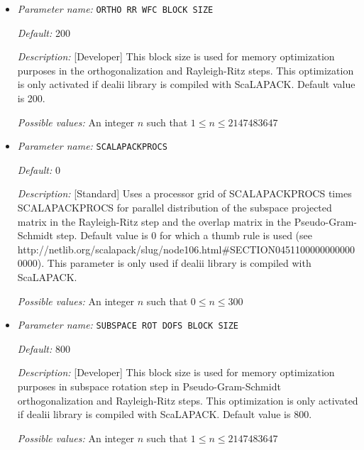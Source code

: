 \begin{itemize}
{\it Possible values:} An integer $n$ such that $0\leq n \leq 300$
\item {\it Parameter name:} {\tt ORTHO RR WFC BLOCK SIZE}
\label{parameters:SCF parameters/Eigen_2dsolver_2fChebyshev solver related parameters/ORTHO RR WFC BLOCK SIZE}
\label{parameters:SCF_20parameters/Eigen_2dsolver_2fChebyshev_20solver_20related_20parameters/ORTHO_20RR_20WFC_20BLOCK_20SIZE}




{\it Default:} 200


{\it Description:} [Developer] This block size is used for memory optimization purposes in the orthogonalization and Rayleigh-Ritz steps. This optimization is only activated if dealii library is compiled with ScaLAPACK. Default value is 200.


{\it Possible values:} An integer $n$ such that $1\leq n \leq 2147483647$
\item {\it Parameter name:} {\tt SCALAPACKPROCS}
\label{parameters:SCF parameters/Eigen_2dsolver_2fChebyshev solver related parameters/SCALAPACKPROCS}
\label{parameters:SCF_20parameters/Eigen_2dsolver_2fChebyshev_20solver_20related_20parameters/SCALAPACKPROCS}




{\it Default:} 0


{\it Description:} [Standard] Uses a processor grid of SCALAPACKPROCS times SCALAPACKPROCS for parallel distribution of the subspace projected matrix in the Rayleigh-Ritz step and the overlap matrix in the Pseudo-Gram-Schmidt step. Default value is 0 for which a thumb rule is used (see http://netlib.org/scalapack/slug/node106.html\#SECTION04511000000000000000). This parameter is only used if dealii library is compiled with ScaLAPACK.


{\it Possible values:} An integer $n$ such that $0\leq n \leq 300$
\item {\it Parameter name:} {\tt SUBSPACE ROT DOFS BLOCK SIZE}
\label{parameters:SCF parameters/Eigen_2dsolver_2fChebyshev solver related parameters/SUBSPACE ROT DOFS BLOCK SIZE}
\label{parameters:SCF_20parameters/Eigen_2dsolver_2fChebyshev_20solver_20related_20parameters/SUBSPACE_20ROT_20DOFS_20BLOCK_20SIZE}




{\it Default:} 800


{\it Description:} [Developer] This block size is used for memory optimization purposes in subspace rotation step in Pseudo-Gram-Schmidt orthogonalization and Rayleigh-Ritz steps. This optimization is only activated if dealii library is compiled with ScaLAPACK. Default value is 800.


{\it Possible values:} An integer $n$ such that $1\leq n \leq 2147483647$
\end{itemize}
